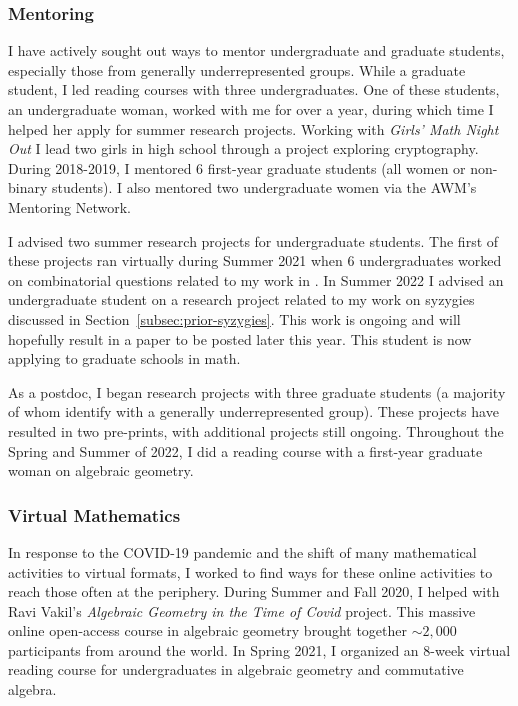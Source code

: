\documentclass[11pt,reqno]{amsart}
\theoremstyle{remark}
\begin{document}
\subsubsection{Mentoring}
I have actively sought out ways to mentor undergraduate and graduate students, especially those from generally underrepresented groups. While a graduate student, I led reading courses with three undergraduates. One of these students, an undergraduate woman, worked with me for over a year, during which time I helped her apply for summer research projects. Working with \textit{Girls' Math Night Out} I lead two girls in high school through a project exploring cryptography. During 2018-2019, I mentored 6 first-year graduate students (all women or non-binary students). I also mentored two undergraduate women via the AWM's Mentoring Network. 

I advised two summer research projects for undergraduate students. The first of these projects ran virtually during Summer 2021 when 6 undergraduates worked on combinatorial questions related to my work in \cite{BBCMMW22}. In Summer 2022 I advised an undergraduate student on a research project related to my work on syzygies discussed in Section~\ref{subsec:prior-syzygies}. This work is ongoing and will hopefully result in a paper to be posted later this year. This student is now applying to graduate schools in math. 

As a postdoc, I began research projects with three graduate students (a majority of whom identify with a generally underrepresented group). These projects have resulted in two pre-prints, with additional projects still ongoing. Throughout the Spring and Summer of 2022, I did a reading course with a first-year graduate woman on algebraic geometry.

\subsubsection{Virtual Mathematics}
In response to the COVID-19 pandemic and the shift of many mathematical activities to virtual formats, I worked to find ways for these online activities to reach those often at the periphery. During Summer and Fall 2020, I helped with Ravi Vakil's \textit{Algebraic Geometry in the Time of Covid} project. This massive online open-access course in algebraic geometry brought together $\sim2,000$ participants from around the world. In Spring 2021, I organized an 8-week virtual reading course for undergraduates in algebraic geometry and commutative algebra. %
\end{document}
